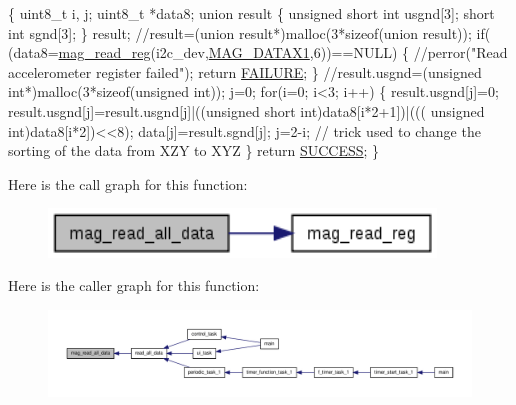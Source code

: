 \begin{DoxyCode}
\{
  uint8\_t i, j;
  uint8\_t *data8;
  \textcolor{keyword}{union }result
  \{
    \textcolor{keywordtype}{unsigned} \textcolor{keywordtype}{short} \textcolor{keywordtype}{int} usgnd[3];
    \textcolor{keywordtype}{short} \textcolor{keywordtype}{int} sgnd[3];
  \} result;
  \textcolor{comment}{//result=(union result*)malloc(3*sizeof(union result));}
  \textcolor{keywordflow}{if}( (data8=\hyperlink{group__mag_ga6830eaeae2298320e1e8c902e4edd709}{mag\_read\_reg}(i2c\_dev,\hyperlink{imu__regs_8h_a4f883328e7ae117996e334145ddd0032}{MAG\_DATAX1},6))==NULL)
  \{
    \textcolor{comment}{//perror("Read accelerometer register failed");}
    \textcolor{keywordflow}{return} \hyperlink{calibration_2calibration_8h_a6d58f9ac447476b4e084d7ca383f5183}{FAILURE};
  \}
  \textcolor{comment}{//result.usgnd=(unsigned int*)malloc(3*sizeof(unsigned int));}
  j=0;
  \textcolor{keywordflow}{for}(i=0; i<3; i++)
  \{
    result.usgnd[j]=0;
    result.usgnd[j]=result.usgnd[j]|((\textcolor{keywordtype}{unsigned} \textcolor{keywordtype}{short} int)data8[i*2+1])|(((\textcolor{keywordtype}{
      unsigned} int)data8[i*2])<<8);
    data[j]=result.sgnd[j];
    j=2-i; \textcolor{comment}{// trick used to change the sorting of the data from XZY to XYZ}
  \}
  \textcolor{keywordflow}{return} \hyperlink{calibration_2calibration_8h_aa90cac659d18e8ef6294c7ae337f6b58}{SUCCESS};  
\}
\end{DoxyCode}


Here is the call graph for this function\-:
\nopagebreak
\begin{figure}[H]
\begin{center}
\leavevmode
\includegraphics[width=292pt]{group__mag_gab42ae0d0a2a6f37cf36d856c072b7f34_cgraph}
\end{center}
\end{figure}




Here is the caller graph for this function\-:
\nopagebreak
\begin{figure}[H]
\begin{center}
\leavevmode
\includegraphics[width=350pt]{group__mag_gab42ae0d0a2a6f37cf36d856c072b7f34_icgraph}
\end{center}
\end{figure}


